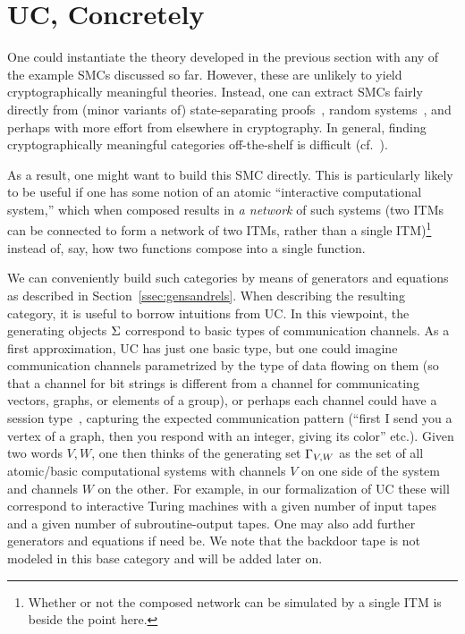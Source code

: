 \section{UC, Concretely}
\label{sec:UCconcrete}

One could instantiate the theory developed in the previous section with any of the example SMCs discussed so far. However, these are unlikely to yield cryptographically meaningful theories. Instead, one can extract SMCs fairly directly from (minor variants of) state-separating proofs~\cite{BDF+18}, random systems~\cite{M02}, and perhaps with more effort from elsewhere in cryptography. In general, finding cryptographically meaningful categories off-the-shelf is difficult (cf.~\cite[Section~9]{BK23}). 

As a result, one might want to build this SMC directly. This is particularly likely to be useful if one has some notion of an atomic ``interactive computational system,'' which when composed results in \emph{a network} of such systems (\eg two ITMs can be connected to form a network of two ITMs, rather than a single ITM)\footnote{Whether or not the composed network can be simulated by a single ITM is beside the point here.} instead of, say, how two functions compose into a single function. 

We can conveniently build such categories by means of generators and equations as described in Section~\ref{ssec:gensandrels}. When describing the resulting category, it is useful to borrow intuitions from UC. In this viewpoint, the generating objects  $\Sigma$ correspond to basic types of communication channels. As a first approximation, UC has just one basic type, but one could imagine communication channels parametrized by the type of data flowing on them (so that a channel for bit strings is different from a channel for communicating vectors, graphs, or elements of a group), or perhaps each channel could have a session type~\cite{bartoletti_combining_2015}, capturing the expected communication pattern (``first I send you a vertex of a graph, then you respond with an integer, giving its color'' etc.). Given two words $V,W$, one then thinks of the generating set $\Gamma_{V,W}$ as the set of all atomic/basic computational systems with channels $V$ on one side of the system and channels $W$ on the other. For example, in our formalization of UC these will correspond to interactive Turing machines with a given number of input tapes and a given number of subroutine-output tapes. One may also add further generators and equations if need be. We note that the backdoor tape is not modeled in this base category and will be added later on. 

